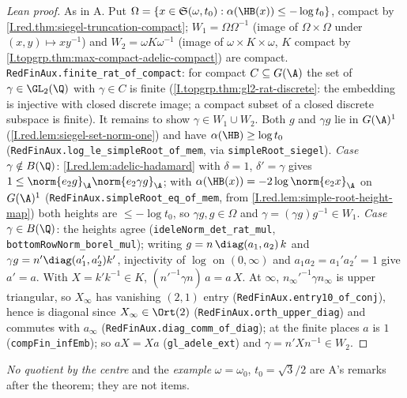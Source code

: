 \begin{proof}[Lean proof]
As in A. Put $\Omega=\{x\in\mathfrak S(\omega,t_0):\alpha(\HB(x))\le-\log t_0\}$, compact by \cref{I.red.thm:siegel-truncation-compact}; $W_1=\Omega\Omega^{-1}$ (image of $\Omega\times\Omega$ under $(x,y)\mapsto xy^{-1}$) and $W_2=\omega K\omega^{-1}$ (image of $\omega\times K\times\omega$, $K$ compact by \cref{I.topgrp.thm:max-compact-adelic-compact}) are compact. \texttt{RedFinAux.finite\_rat\_of\_compact}: for compact $C\subseteq G(\A)$ the set of $\gamma\in\GL_2(\Q)$ with $\gamma\in C$ is finite (\cref{I.topgrp.thm:gl2-rat-discrete}: the embedding is injective with closed discrete image; a compact subset of a closed discrete subspace is finite). It remains to show $\gamma\in W_1\cup W_2$. Both $g$ and $\gamma g$ lie in $G(\A)^1$ (\cref{I.red.lem:siegel-set-norm-one}) and have $\alpha(\HB)\ge\log t_0$ (\texttt{RedFinAux.log\_le\_simpleRoot\_of\_mem}, via \texttt{simpleRoot\_siegel}). \emph{Case $\gamma\notin B(\Q)$}: \cref{I.red.lem:adelic-hadamard} with $\delta=1$, $\delta'=\gamma$ gives $1\le\norm{e_2g}_\A\norm{e_2\gamma g}_\A$; with $\alpha(\HB(x))=-2\log\norm{e_2x}_\A$ on $G(\A)^1$ (\texttt{RedFinAux.simpleRoot\_eq\_of\_mem}, from \cref{I.red.lem:simple-root-height-map}) both heights are $\le-\log t_0$, so $\gamma g,g\in\Omega$ and $\gamma=(\gamma g)g^{-1}\in W_1$. \emph{Case $\gamma\in B(\Q)$}: the heights agree (\texttt{ideleNorm\_det\_rat\_mul}, \texttt{bottomRowNorm\_borel\_mul}); writing $g=n\,\diag(a_1,a_2)\,k$ and $\gamma g=n'\diag(a_1',a_2')k'$, injectivity of $\log$ on $(0,\infty)$ and $a_1a_2=a_1'a_2'=1$ give $a'=a$. With $X=k'k^{-1}\in K$, $(n'^{-1}\gamma n)\,a=a\,X$. At $\infty$, $n_\infty'^{-1}\gamma n_\infty$ is upper triangular, so $X_\infty$ has vanishing $(2,1)$ entry (\texttt{RedFinAux.entry10\_of\_conj}), hence is diagonal since $X_\infty\in\Ort(2)$ (\texttt{RedFinAux.orth\_upper\_diag}) and commutes with $a_\infty$ (\texttt{RedFinAux.diag\_comm\_of\_diag}); at the finite places $a$ is $1$ (\texttt{compFin\_infEmb}); so $aX=Xa$ (\texttt{gl\_adele\_ext}) and $\gamma=n'Xn^{-1}\in W_2$.
\end{proof}
\noindent\emph{No quotient by the centre} and the \emph{example} $\omega=\omega_0$, $t_0=\sqrt3/2$ are A's remarks after the theorem; they are not items.
